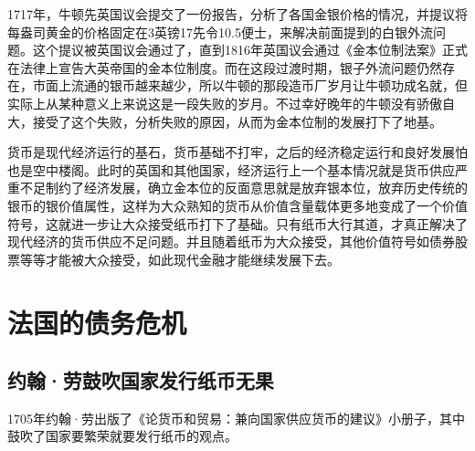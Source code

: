 \documentclass[12pt,oneside]{book}
\begin{document}
1717年，牛顿先英国议会提交了一份报告，分析了各国金银价格的情况，并提议将每盎司黄金的价格固定在3英镑17先令10.5便士，来解决前面提到的白银外流问题。这个提议被英国议会通过了，直到1816年英国议会通过《金本位制法案》正式在法律上宣告大英帝国的金本位制度。而在这段过渡时期，银子外流问题仍然存在，市面上流通的银币越来越少，所以牛顿的那段造币厂岁月让牛顿功成名就，但实际上从某种意义上来说这是一段失败的岁月。不过幸好晚年的牛顿没有骄傲自大，接受了这个失败，分析失败的原因，从而为金本位制的发展打下了地基。

货币是现代经济运行的基石，货币基础不打牢，之后的经济稳定运行和良好发展怕也是空中楼阁。此时的英国和其他国家，经济运行上一个基本情况就是货币供应严重不足制约了经济发展，确立金本位的反面意思就是放弃银本位，放弃历史传统的银币的银价值属性，这样为大众熟知的货币从价值含量载体更多地变成了一个价值符号，这就进一步让大众接受纸币打下了基础。只有纸币大行其道，才真正解决了现代经济的货币供应不足问题。并且随着纸币为大众接受，其他价值符号如债券股票等等才能被大众接受，如此现代金融才能继续发展下去。



\chapter{法国的债务危机}
\section{约翰·劳鼓吹国家发行纸币无果}
1705年约翰·劳出版了《论货币和贸易：兼向国家供应货币的建议》小册子，其中鼓吹了国家要繁荣就要发行纸币的观点。
\end{document}
